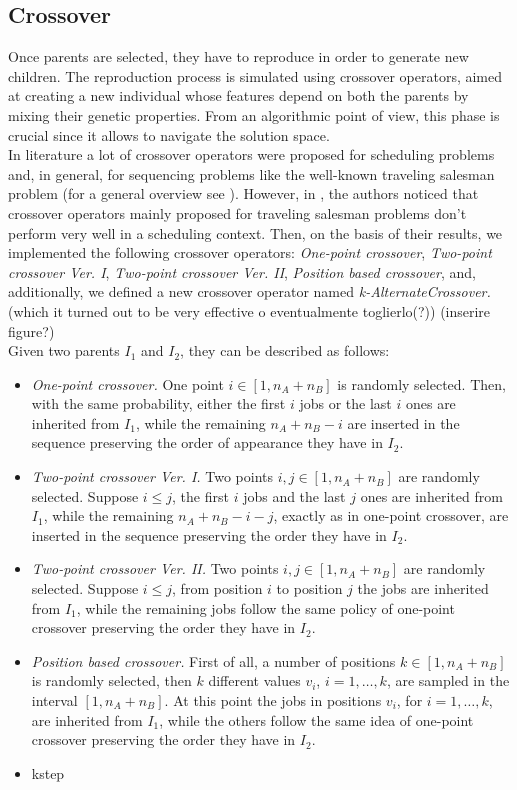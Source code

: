 \documentclass[opre,nonblindrev]{informs3} %
\begin{document}
\subsection{Crossover}
Once parents are selected, they have to reproduce in order to generate new children. The reproduction process is simulated using crossover operators, aimed at creating a new individual whose features depend on both the parents by mixing their genetic properties. From an algorithmic point of view, this phase is crucial since it allows to navigate the solution space. \\
In literature a lot of crossover operators were proposed for scheduling problems and, in general, for sequencing problems like the well-known traveling salesman problem (for a general overview see \cite{cross1}). However, in \cite{sched1}, the authors noticed that crossover operators mainly proposed for traveling salesman problems don't perform very well in a scheduling context. Then, on the basis of their results, we implemented the following crossover operators: \textit{One-point crossover}, \textit{Two-point crossover Ver. I}, \textit{Two-point crossover Ver. II}, \textit{Position based crossover}, and, additionally, we defined a new crossover operator named \textit{k-AlternateCrossover.} (which it turned out to be very effective o eventualmente toglierlo(?)) (inserire figure?)\\
Given two parents $I_1$ and $I_2$, they can be described as follows: 
\begin{itemize}
	\item \textit{One-point crossover.} One point $i \in [1,n_A+n_B]$ is randomly selected. Then, with the same probability, either the first $i$ jobs or the last $i$ ones are inherited from $I_1$, while the remaining $n_A+n_B-i$ are inserted in the sequence preserving the order of appearance they have in $I_2$. 
	\item \textit{Two-point crossover Ver. I.} Two points $i,j \in [1,n_A+n_B]$ are randomly selected. Suppose $i \le j$, the first $i$ jobs and the last $j$ ones are inherited from $I_1$, while the remaining $n_A+n_B-i-j$, exactly as in one-point crossover, are inserted in the sequence preserving the order they have in $I_2$.
	\item \textit{Two-point crossover Ver. II.} Two points $i,j \in [1,n_A+n_B]$ are randomly selected. Suppose $i \le j$, from position $i$ to position $j$ the jobs are inherited from $I_1$, while the remaining jobs follow the same policy of one-point crossover preserving the order they have in $I_2$.
	\item \textit{Position based crossover.} First of all, a number of positions $k \in [1,n_A+n_B]$ is randomly selected, then $k$ different values $v_i$, $i=1,\ldots,k$, are sampled in the interval $[1,n_A+n_B].$ At this point the jobs in positions $v_i$, for $i=1,\ldots,k$, are inherited from $I_1$, while the others follow the same idea of one-point crossover preserving the order they have in $I_2$.
	\item kstep
\end{itemize}
\end{document}
